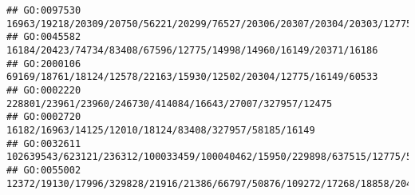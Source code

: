 \documentclass[
]{article}
\begin{document}
\begin{verbatim}
## GO:0097530                                                                                                                                                                                                                                                                                                                                16963/19218/20309/20750/56221/20299/76527/20306/20307/20304/20303/12775/16149
## GO:0045582                                                                                                                                                                                                                                                                                                                                            16184/20423/74734/83408/67596/12775/14998/14960/16149/20371/16186
## GO:2000106                                                                                                                                                                                                                                                                                                                                            69169/18761/18124/12578/22163/15930/12502/20304/12775/16149/60533
## GO:0002220                                                                                                                                                                                                                                                                                                                                                    228801/23961/23960/246730/414084/16643/27007/327957/12475
## GO:0002720                                                                                                                                                                                                                                                                                                                                                       16182/16963/14125/12010/18124/83408/327957/58185/16149
## GO:0032611                                                                                                                                                                                                                                                                                                                                  102639543/623121/236312/100033459/100040462/15950/229898/637515/12775/54483
## GO:0055002                                                                                                                                                                                                                                                                                                                 12372/19130/17996/329828/21916/21386/66797/50876/109272/17268/18858/20474/65256/18092/225288

\end{verbatim}
\end{document}

